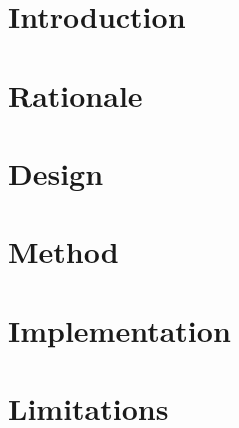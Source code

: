 \section{Introduction}
\label{sec:rebuilding:introduction}



\section{Rationale}
\label{sec:rebuilding:rationale}



\section{Design}
\label{sec:rebuilding:design}



\section{Method}


\section{Implementation}


\section{Limitations}



